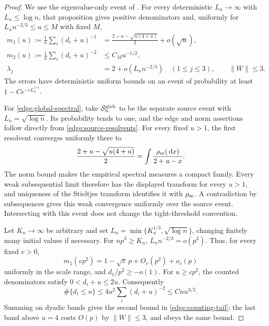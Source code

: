 \begin{proof}
We use the eigenvalue-only event of \cite[Proposition~3.1]{CS}.
For every deterministic \(L_n\to\infty\) with \(L_n\le\log n\), that
proposition gives positive denominators and, uniformly for
\(L_nn^{-2/3}\le u\le M\) with fixed \(M\),
\begin{equation}\label{edge:source-resolvents}
 \begin{split}
 m_1(u):=\frac1n\sum_i(d_i+u)^{-1}
  &=\frac{2+u-\sqrt{u(4+u)}}2+o(\sqrt u),\\
 m_2(u):=\frac1n\sum_i(d_i+u)^{-2}
  &\le C_Mu^{-1/2},\\
 \lambda_j&=2+o(L_nn^{-2/3})\quad(1\le j\le3),
 \qquad \|W\|\le3 .
 \end{split}
\end{equation}
The errors have deterministic uniform bounds on an event of probability
at least \(1-Ce^{-cL_n^{1/4}}\).

For \eqref{edge:global-spectral}, take \(\mathcal S_n^{\rm glob}\) to be
the separate source event with \(L_n=\sqrt{\log n}\).  Its probability
tends to one, and the edge and
norm assertions follow directly from \eqref{edge:source-resolvents}.
For every fixed \(u>1\), the first resolvent converges uniformly there
to
\[
 \frac{2+u-\sqrt{u(4+u)}}2
 =\int\frac{\rho_{\rm sc}(\,\mathrm d x)}{2+u-x}.
\]
The norm bound makes the empirical spectral measures a compact family.
Every weak subsequential limit therefore has the displayed transform
for every \(u>1\), and uniqueness of the Stieltjes transform identifies
it with \(\rho_{\rm sc}\).  A contradiction by subsequences gives this
weak convergence uniformly over the source event.  Intersecting with
this event does not change the tight-threshold convention.

Let \(K_n\to\infty\) be arbitrary and set
\(L_n=\min\{K_n^{1/3},\sqrt{\log n}\}\), changing finitely many initial
values if necessary.  For \(np^3\ge K_n\),
\(L_nn^{-2/3}=o(p^2)\).  Thus, for every fixed \(v>0\),
\[
 m_1(vp^2)=1-\sqrt v\,p+O_v(p^2)+o_v(p)
\]
uniformly in the scale range, and \(d_1/p^2\ge-o(1)\).  For
\(u\ge cp^2\), the counted denominators satisfy \(0<d_i+u\le2u\).
Consequently
\[
 \#\{d_i\le u\}\le4u^2\sum_i(d_i+u)^{-2}\le Cnu^{3/2}.
\]
Summing on dyadic bands gives the second bound in
\eqref{edge:counting-tail}; the last band above \(u=4\) costs \(O(p)\)
by \(\|W\|\le3\), and obeys the same bound.


\end{proof}
